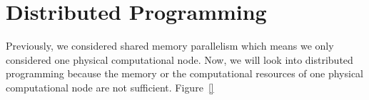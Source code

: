 \chapter{Distributed Programming}
\label{sec:distributed:programming}
Previously, we considered shared memory parallelism which means we only considered one physical computational node. Now, we will look into distributed programming because the memory or the computational resources of one physical computational node are not sufficient. Figure~\ref{}





\newpage
\theendnotes